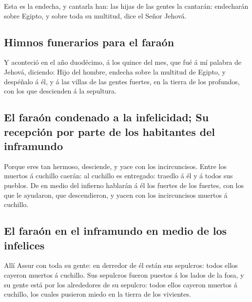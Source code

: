  Esta es la endecha, y cantarla han: las hijas de las
gentes la cantarán: endecharán sobre Egipto, y sobre toda su multitud,
dice el Señor Jehová.

\hypertarget{himnos-funerarios-para-el-farauxf3n}{%
\subsection{Himnos funerarios para el
faraón}\label{himnos-funerarios-para-el-farauxf3n}}

 Y aconteció en el año duodécimo, á los quince del mes,
que fué á mí palabra de Jehová, diciendo:  Hijo del
hombre, endecha sobre la multitud de Egipto, y despéñalo á él, y á las
villas de las gentes fuertes, en la tierra de los profundos, con los que
descienden á la sepultura.

\hypertarget{el-farauxf3n-condenado-a-la-infelicidad-su-recepciuxf3n-por-parte-de-los-habitantes-del-inframundo}{%
\subsection{El faraón condenado a la infelicidad; Su recepción por parte
de los habitantes del
inframundo}\label{el-farauxf3n-condenado-a-la-infelicidad-su-recepciuxf3n-por-parte-de-los-habitantes-del-inframundo}}

 Porque eres tan hermoso, desciende, y yace con los
incircuncisos.  Entre los muertos á cuchillo caerán: al
cuchillo es entregado: traedlo á él y á todos sus pueblos.
 De en medio del infierno hablarán á él los fuertes de
los fuertes, con los que le ayudaron, que descendieron, y yacen con los
incircuncisos muertos á cuchillo.

\hypertarget{el-farauxf3n-en-el-inframundo-en-medio-de-los-infelices}{%
\subsection{El faraón en el inframundo en medio de los
infelices}\label{el-farauxf3n-en-el-inframundo-en-medio-de-los-infelices}}

 Allí Assur con toda su gente: en derredor de él están
sus sepulcros: todos ellos cayeron muertos á cuchillo. 
Sus sepulcros fueron puestos á los lados de la fosa, y su gente está por
los alrededores de su sepulcro: todos ellos cayeron muertos á cuchillo,
los cuales pusieron miedo en la tierra de los vivientes.

